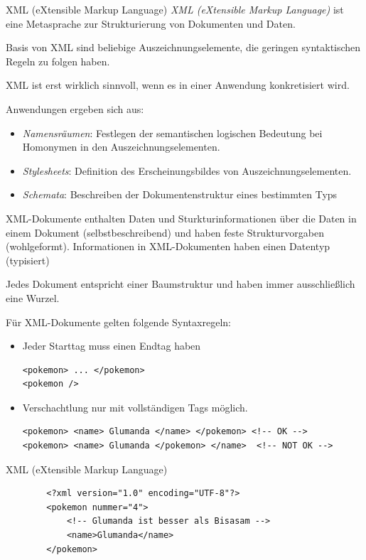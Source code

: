 \begin{defi}{XML (eXtensible Markup Language)}
    \emph{XML (eXtensible Markup Language)} ist eine Metasprache zur Strukturierung von Dokumenten und Daten.

    Basis von XML sind beliebige Auszeichnungselemente, die geringen syntaktischen Regeln zu folgen haben.

    XML ist erst wirklich sinnvoll, wenn es in einer Anwendung konkretisiert wird.

    Anwendungen ergeben sich aus:
    \begin{itemize}
        \item \emph{Namensräumen}:
              Festlegen der semantischen logischen Bedeutung bei Homonymen in den Auszeichnungselementen.
        \item \emph{Stylesheets}:
              Definition des Erscheinungsbildes von Auszeichnungselementen.
        \item \emph{Schemata}:
              Beschreiben der Dokumentenstruktur eines bestimmten Typs
    \end{itemize}

    XML-Dokumente enthalten Daten und Sturkturinformationen über die Daten in einem Dokument (selbstbeschreibend) und haben feste Strukturvorgaben (wohlgeformt).
    Informationen in XML-Dokumenten haben einen Datentyp (typisiert)

    Jedes Dokument entspricht einer Baumstruktur und haben immer ausschließlich eine Wurzel.

    Für XML-Dokumente gelten folgende Syntaxregeln:

    \begin{itemize}
        \item Jeder Starttag muss einen Endtag haben

              \begin{lstlisting}
<pokemon> ... </pokemon>
<pokemon />
\end{lstlisting}
        \item Verschachtlung nur mit vollständigen Tags möglich.

              \begin{lstlisting}
<pokemon> <name> Glumanda </name> </pokemon> <!-- OK -->
<pokemon> <name> Glumanda </pokemon> </name>  <!-- NOT OK -->
\end{lstlisting}
    \end{itemize}
\end{defi}

\begin{example}{XML (eXtensible Markup Language)}
    \begin{lstlisting}
        <?xml version="1.0" encoding="UTF-8"?>
        <pokemon nummer="4">
            <!-- Glumanda ist besser als Bisasam -->
            <name>Glumanda</name>
        </pokemon>
    \end{lstlisting}
\end{example}

